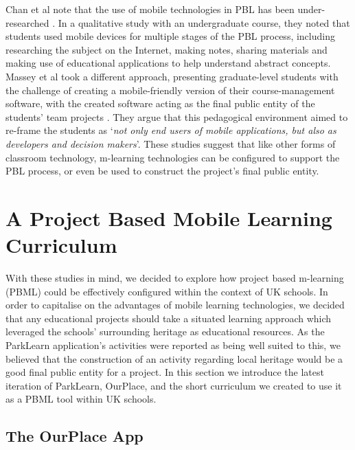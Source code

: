 \documentclass[,hyphens]{sigchi}
\begin{document}
Chan et al note that the use of mobile technologies in PBL has been under-researched \cite{Chan2015}. In a qualitative study with an undergraduate course, they noted that students used mobile devices for multiple stages of the PBL process, including researching the subject on the Internet, making notes, sharing materials and making use of educational applications to help understand abstract concepts. Massey et al took a different approach, presenting graduate-level students with the challenge of creating a mobile-friendly version of their course-management software, with the created software acting as the final public entity of the students' team projects \cite{Massey2006}. They argue that this pedagogical environment aimed to re-frame the students as `\textit{not only end users of mobile applications, but also as developers and decision makers}'. These studies suggest that like other forms of classroom technology, m-learning technologies can be configured to support the PBL process, or even be used to construct the project's final public entity.

\section{A Project Based Mobile Learning Curriculum}

With these studies in mind, we decided to explore how project based m-learning  (PBML) could be effectively configured within the context of UK schools. In order to capitalise on the advantages of mobile learning technologies, we decided that any educational projects should take a situated learning approach which leveraged the schools' surrounding heritage as educational resources. As the ParkLearn application's activities were reported as being well suited to this, we believed that the construction of an activity regarding local heritage would be a good final public entity for a project. In this section we introduce the latest iteration of ParkLearn, OurPlace, and the short curriculum we created to use it as a PBML tool within UK schools.

\subsection{The OurPlace App}
\end{document}
